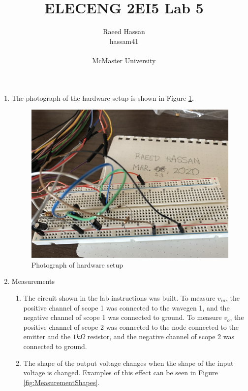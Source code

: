 \documentclass[12pt]{article}
\title{ELECENG 2EI5 Lab 5}
\author{Raeed Hassan \\ hassam41 \\  \\ McMaster University}
\begin{document}
\maketitle
\pagebreak

\begin{enumerate}
    \item The photograph of the hardware setup is shown in Figure \ref{fig:Circuit}.
    \begin{figure}[h!]
        \centering
        \includegraphics[width=\textwidth]{Circuit.png}
        \caption{Photograph of hardware setup}
        \label{fig:Circuit}
    \end{figure}
    \item Measurements
    \begin{enumerate}
        \item The circuit shown in the lab instructions was built. To measure $v_{in}$, the positive channel of scope 1 was connected to the wavegen 1, and the negative channel of scope 1 was connected to ground. To measure $v_o$, the positive channel of scope 2 was connected to the node connected to the emitter and the $1k\Omega$ resistor, and the negative channel of scope 2 was connected to ground. 
        \item The shape of the output voltage changes when the shape of the input voltage is changed. Examples of this effect can be seen in Figure \ref{fig:MeasurementShapes}. \\
        \begin{figure}[h!]
            \centering
            \begin{subfigure}[b]{0.31\textwidth}

\end{subfigure}
\end{figure}
\end{enumerate}
\end{enumerate}
\end{document}
